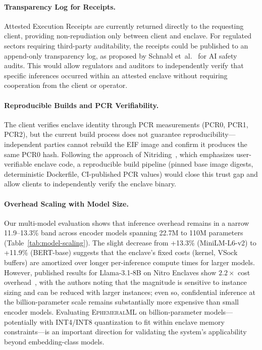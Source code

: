 \documentclass[11pt,a4paper]{article}
\newcommand{\BenchModelName}{MiniLM-L6-v2}
\newcommand{\BenchOverheadPct}{13.3\%}
\newcommand{\ModelBertBaseOverheadPct}{11.9\%}
\newcommand{\BenchOverheadRange}{11.9--13.3\%}
\begin{document}
\paragraph{Transparency Log for Receipts.}
Attested Execution Receipts are currently returned directly to the requesting client, providing non-repudiation only between client and enclave.
For regulated sectors requiring third-party auditability, the receipts could be published to an append-only transparency log, as proposed by Schnabl et~al.~\cite{schnabl2025} for AI safety audits.
This would allow regulators and auditors to independently verify that specific inferences occurred within an attested enclave without requiring cooperation from the client or operator.

\paragraph{Reproducible Builds and PCR Verifiability.}
The client verifies enclave identity through PCR measurements (PCR0, PCR1, PCR2), but the current build process does not guarantee reproducibility---independent parties cannot rebuild the EIF image and confirm it produces the same PCR0 hash.
Following the approach of Nitriding~\cite{winter2023}, which emphasizes user-verifiable enclave code, a reproducible build pipeline (pinned base image digests, deterministic Dockerfile, CI-published PCR values) would close this trust gap and allow clients to independently verify the enclave binary.

\paragraph{Overhead Scaling with Model Size.}
Our multi-model evaluation shows that inference overhead remains in a narrow \BenchOverheadRange{} band across encoder models spanning 22.7M to 110M parameters (Table~\ref{tab:model-scaling}).
The slight decrease from +\BenchOverheadPct{} (\BenchModelName{}) to +\ModelBertBaseOverheadPct{} (BERT-base) suggests that the enclave's fixed costs (kernel, VSock buffers) are amortized over longer per-inference compute times for larger models.
However, published results for Llama-3.1-8B on Nitro Enclaves show $2.2\times$ cost overhead~\cite{schnabl2025}, with the authors noting that the magnitude is sensitive to instance sizing and can be reduced with larger instances; even so, confidential inference at the billion-parameter scale remains substantially more expensive than small encoder models.
Evaluating \textsc{EphemeralML} on billion-parameter models---potentially with INT4/INT8 quantization to fit within enclave memory constraints---is an important direction for validating the system's applicability beyond embedding-class models.
\end{document}
